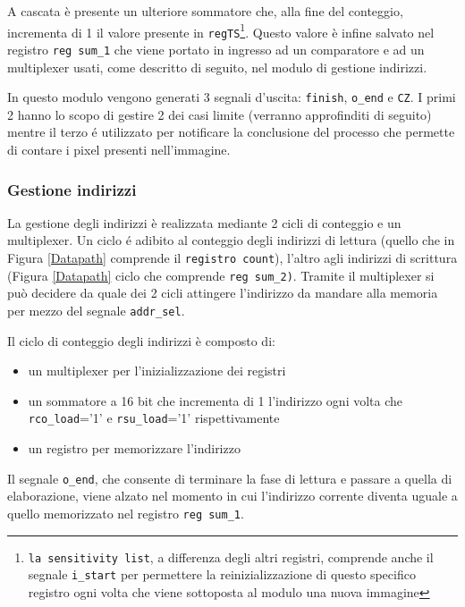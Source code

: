 
 A cascata è presente un ulteriore sommatore che, alla fine del conteggio, incrementa di 1 il valore presente in \texttt{regTS}\footnote{\texttt{la sensitivity list}, a differenza degli altri registri, comprende anche il segnale \texttt{i\_start} per permettere la reinizializzazione di questo specifico registro ogni volta che viene sottoposta al modulo una nuova immagine}. Questo valore è infine salvato nel registro \texttt{reg sum\_1} che viene portato in ingresso ad un comparatore e ad un multiplexer usati, come descritto di seguito, nel modulo di gestione indirizzi.

In questo modulo vengono generati 3 segnali d'uscita: \texttt{finish}, \texttt{o\_end} e \texttt{CZ}. I primi 2 hanno lo scopo di gestire 2 dei casi limite (verranno approfinditi di seguito) mentre il terzo é utilizzato per notificare la conclusione del processo che permette di contare i pixel presenti nell'immagine.



\subsubsection{Gestione indirizzi}
La gestione degli indirizzi è realizzata mediante 2 cicli di conteggio e un multiplexer.
Un ciclo é adibito al conteggio degli indirizzi di lettura (quello che in Figura \ref{Datapath} comprende il \texttt{registro count}), l'altro agli indirizzi di scrittura (Figura \ref{Datapath} ciclo che comprende \texttt{reg sum\_2)}. Tramite il multiplexer si può decidere da quale dei 2 cicli attingere l'indirizzo da mandare alla memoria per mezzo del segnale \texttt{addr\_sel}.

\newpage

Il ciclo di conteggio degli indirizzi è composto di:
\begin{itemize}
\item un multiplexer per l'inizializzazione dei registri
\item un sommatore a 16 bit che incrementa di 1 l'indirizzo ogni volta che \texttt{rco\_load}='1' e \texttt{rsu\_load}='1' rispettivamente
\item un registro per memorizzare l'indirizzo
\end{itemize}

Il segnale \texttt{o\_end}, che consente di terminare la fase di lettura e passare a quella di elaborazione, viene alzato nel momento in cui l'indirizzo corrente diventa uguale a quello memorizzato nel registro \texttt{reg sum\_1}.

